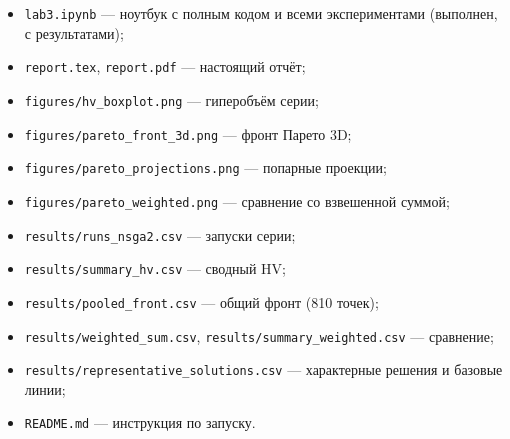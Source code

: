 \documentclass[12pt,a4paper]{article}
\begin{document}
\begin{itemize}
\item \texttt{lab3.ipynb} --- ноутбук с полным кодом и всеми
  экспериментами (выполнен, с результатами);
\item \texttt{report.tex}, \texttt{report.pdf} --- настоящий отчёт;
\item \texttt{figures/hv\_boxplot.png} --- гиперобъём серии;
\item \texttt{figures/pareto\_front\_3d.png} --- фронт Парето 3D;
\item \texttt{figures/pareto\_projections.png} --- попарные проекции;
\item \texttt{figures/pareto\_weighted.png} --- сравнение со взвешенной
  суммой;
\item \texttt{results/runs\_nsga2.csv} --- запуски серии;
\item \texttt{results/summary\_hv.csv} --- сводный HV;
\item \texttt{results/pooled\_front.csv} --- общий фронт (810 точек);
\item \texttt{results/weighted\_sum.csv},
  \texttt{results/summary\_weighted.csv} --- сравнение;
\item \texttt{results/representative\_solutions.csv} --- характерные
  решения и базовые линии;
\item \texttt{README.md} --- инструкция по запуску.
\end{itemize}
\end{document}

